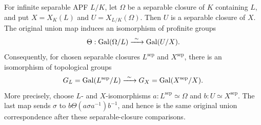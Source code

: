 \begin{corollary}
\label{fw:absolute-galois}
\leanok
For infinite separable APF $L/K$, let $\Omega$ be a separable closure
of $K$ containing $L$, and put $X=X_K(L)$ and
$U=X_{L/K}(\Omega)$. Then $U$ is a separable closure of $X$.
The original union map induces an isomorphism of profinite groups
\[
 \Theta:\Gal(\Omega/L)\xrightarrow{\ \sim\ }\Gal(U/X).
\]
Consequently, for chosen separable closures $L^{\mathrm{sep}}$ and
$X^{\mathrm{sep}}$, there is an isomorphism of topological groups
\[
 G_L=\operatorname{Gal}(L^{\mathrm{sep}}/L)
       \xrightarrow{\ \sim\ }
 G_X=\operatorname{Gal}(X^{\mathrm{sep}}/X).
\]
More precisely, choose $L$- and $X$-isomorphisms
$a:L^{\mathrm{sep}}\simeq\Omega$ and
$b:U\simeq X^{\mathrm{sep}}$. The last map sends $\sigma$ to
$b\Theta(a\sigma a^{-1})b^{-1}$, and hence is the same original
union correspondence after these separable-closure comparisons.
\end{corollary}
